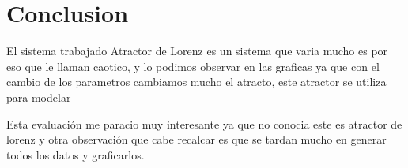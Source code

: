 \documentclass{article}
\begin{document}
\section{Conclusion}

El sistema trabajado Atractor de Lorenz es un sistema que varia mucho es por eso que le llaman caotico, y lo podimos observar en las graficas ya que con el cambio de los parametros cambiamos mucho el atracto, este atractor se utiliza para modelar


Esta evaluación me paracio muy interesante ya que no conocia este es atractor de lorenz y otra observación que cabe recalcar es que se tardan mucho en generar todos los datos y graficarlos.
\end{document}
